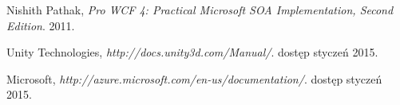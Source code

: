 \begin{thebibliography}{9}
 
  Nishith Pathak,
  \emph{Pro WCF 4: Practical Microsoft SOA Implementation, Second Edition}.
  2011.
  
  Unity Technologies,
  \emph{http://docs.unity3d.com/Manual/}.
  dostęp styczeń 2015.
  
  Microsoft,
  \emph{http://azure.microsoft.com/en-us/documentation/}.
  dostęp styczeń 2015.
 
\end{thebibliography}